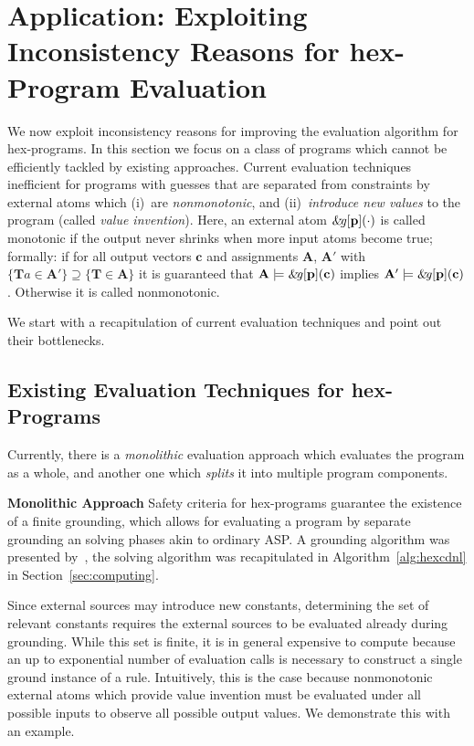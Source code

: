 \documentclass[11pt,fleqn,twoside]{article}
\newcommand{\leanparagraph}[1]{\smallskip\noindent\textbf{#1}}
\renewcommand{\vec}[1]{\ensuremath{\mb{#1}}}
\newcommand{\mb}[1]{\ensuremath{\mathbf{#1}}}
\newcommand\hex{{\sc hex}\xspace}
\newcommand{\amp}[1]{\ensuremath{\text{\textsl{{\&}}}\!\mathit{#1}}}
\newcommand{\ext}[3]{\ensuremath{\amp{#1}[#2](#3)}}
\newcommand{\T}{\mathbf{T}}
\newcommand{\Assignment}{\ensuremath{\mathbf{A}}}
\begin{document}
	\section{Application: Exploiting Inconsistency Reasons for \hex-Program Evaluation}
	\label{sec:hexprogramevaluation}
	
		We now exploit inconsistency reasons for improving the evaluation algorithm for \hex-programs.
		In this section we focus on a class of programs which cannot be efficiently tackled by existing approaches.
		Current evaluation techniques inefficient for programs with guesses that are separated from
		constraints by external atoms which (i)~are \emph{nonmonotonic}, and (ii)~\emph{introduce new values} to the program (called \emph{value invention}).
		Here, an external atom $\ext{g}{\vec{p}}{\cdot}$ is called monotonic if
		the output never shrinks when more input atoms become true;
		formally: if for all output vectors $\vec{c}$
		and assignments $\Assignment$, $\Assignment'$ with $\{ \T a \in \Assignment' \} \supseteq \{ \T \in \Assignment \}$
		it is guaranteed that $\Assignment \models \ext{g}{\vec{p}}{\vec{c}}$ implies $\Assignment' \models \ext{g}{\vec{p}}{\vec{c}}$.
		Otherwise it is called nonmonotonic.
		
		We start with a recapitulation of current evaluation techniques and point out their bottlenecks.

		\subsection{Existing Evaluation Techniques for \hex-Programs}
		\label{sec:hexprogramevaluationn:existing}

			Currently, there is a \emph{monolithic} evaluation approach which evaluates the program as a whole,
			and another one which \emph{splits} it into multiple program components.
		
			\leanparagraph{Monolithic Approach}
			Safety criteria for \hex-programs guarantee the existence of a finite grounding,
			which allows for evaluating a program by separate grounding an solving phases akin to ordinary ASP.
			A grounding algorithm was presented by~,
			the solving algorithm was recapitulated in Algorithm~\ref{alg:hexcdnl} in Section~\ref{sec:computing}.
			
			Since external sources may introduce new constants, determining the set of relevant constants
			requires the external sources to be evaluated already during grounding.
			While this set is finite, it is in general expensive to compute
			because an up to exponential number of evaluation calls is necessary to construct a single ground instance of a rule.
			Intuitively, this is the case because nonmonotonic external atoms which provide value invention
			must be evaluated under all possible inputs to observe all possible output values.
			We demonstrate this with an example.
\end{document}
